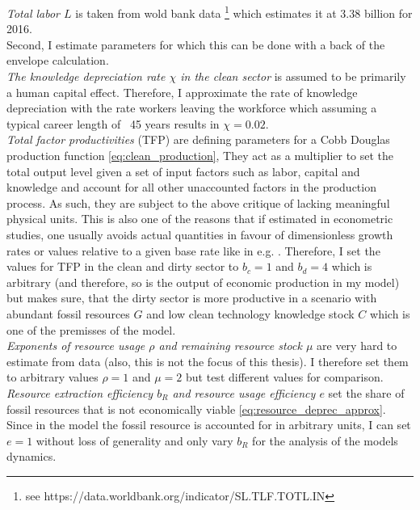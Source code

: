 \textit{Total labor $L$} is taken from wold bank data \footnote{see https://data.worldbank.org/indicator/SL.TLF.TOTL.IN} which estimates it at 3.38 billion for 2016.\\

Second, I estimate parameters for which this can be done with a back of the envelope calculation.\\

\textit{The knowledge depreciation rate $\chi$ in the clean sector} is assumed to be primarily a human capital effect. Therefore, I approximate the rate of knowledge depreciation with the rate workers leaving the workforce which assuming a typical career length of ~45 years results in $\chi=0.02$. \\


\textit{Total factor productivities} (TFP) are defining parameters for a Cobb Douglas production function \eqref{eq:clean_production}, They act as a multiplier to set the total output level given a set of input factors such as labor, capital and knowledge and account for all other unaccounted factors in the production process. As such, they are subject to the above critique of lacking meaningful physical units. This is also one of the reasons that if estimated in econometric studies, one usually avoids actual quantities in favour of dimensionless growth rates or values relative to a given base rate like in e.g. \cite{Gal2013, Hooper1997, Bernstein2018}. Therefore, I set the values for TFP in the clean and dirty sector to $b_c=1$ and $b_d=4$ which is arbitrary (and therefore, so is the output of economic production in my model) but makes sure, that the dirty sector is more productive in a scenario with abundant fossil resources $G$ and low clean technology knowledge stock $C$ which is one of the premisses of the model. \\




\textit{Exponents of resource usage $\rho$ and remaining resource stock $\mu$} are very hard to estimate from data (also, this is not the focus of this thesis). I therefore set them to arbitrary values $\rho=1$ and $\mu=2$ but test different values for comparison.\\

\textit{Resource extraction efficiency $b_R$ and resource usage efficiency $e$} set the share of fossil resources that is not economically viable \eqref{eq:resource_deprec_approx}. Since in the model the fossil resource is accounted for in arbitrary units, I can set $e=1$ without loss of generality and only vary $b_R$ for the analysis of the models dynamics.\\

